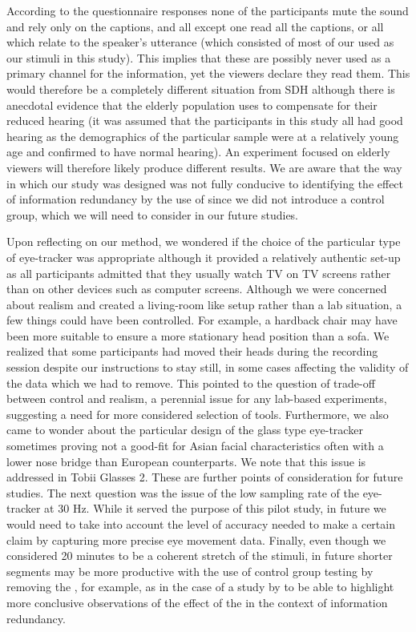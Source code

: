 \documentclass[output=paper]{langsci/langscibook}
\begin{document}
According to the questionnaire responses none of the participants mute the sound and rely only on the captions, and all except one read all the captions, or all which relate to the speaker's utterance (which consisted of most of our  used as our stimuli in this study). This implies that these  are possibly never used as a primary channel for the information, yet the viewers declare they read them. This would therefore be a completely different situation from SDH although there is anecdotal evidence that the elderly population uses  to compensate for their reduced hearing (it was assumed that the participants in this study all had good hearing as the demographics of the particular sample were at a relatively young age and confirmed to have normal hearing). An experiment focused on elderly viewers will therefore likely produce different results. We are aware that the way in which our study was designed was not fully conducive to identifying the effect of information redundancy by the use of  since we did not introduce a control group, which we will need to consider in our future studies.    


Upon reflecting on our method, we wondered if the choice of the particular type of eye-tracker was appropriate although it provided a relatively authentic set-up as all participants admitted that they usually watch TV on TV screens rather than on other devices such as computer screens. Although we were concerned about realism and created a living-room like setup rather than a lab situation, a few things could have been controlled.  For example, a hardback chair may have been more suitable to ensure a more stationary head position than a sofa. We realized that some participants had moved their heads during the recording session despite our instructions to stay still, in some cases affecting the validity of the data which we had to remove. This pointed to the question of trade-off between control and realism, a perennial issue for any lab-based experiments, suggesting a need for more considered selection of  tools. Furthermore, we also came to wonder about the particular design of the glass type eye-tracker sometimes proving not a good-fit for Asian facial characteristics often with a lower nose bridge than European counterparts. We note that this issue is addressed in Tobii Glasses 2. These are further points of consideration for future studies. The next question was the issue of the low sampling rate of the eye-tracker at 30 Hz. While it served the purpose of this pilot study, in future we would need to take into account the level of accuracy needed to make a certain claim by capturing more precise eye movement data.  Finally, even though we considered 20 minutes to be a coherent stretch of the stimuli, in future shorter segments may be more productive with the use of control group testing by removing the , for example, as in the case of a study by \citet{Matsukawa2009} to be able to highlight more conclusive observations of the effect of the  in the context of information redundancy.   
\end{document}
